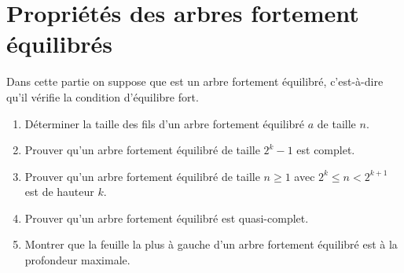 \section{Propriétés des arbres fortement équilibrés}
Dans cette partie on suppose que  est un arbre fortement équilibré, c'est-à-dire qu'il vérifie la condition d'équilibre fort.
\begin{Exercise}{\it
\begin{enumerate}
\item Déterminer la taille des fils d'un arbre fortement équilibré $a$ de taille $n$.
\item Prouver qu'un arbre  fortement équilibré de taille $2^k-1$ est complet.
\item Prouver qu'un arbre  fortement équilibré de taille $n\ge 1$ avec $2^k \le n < 2^{k+1}$ est de hauteur $k$.
\item Prouver qu'un arbre  fortement équilibré est quasi-complet.
\item Montrer que la feuille la plus à gauche d'un arbre fortement équilibré est à la profondeur maximale.
\end{enumerate} }
\end{Exercise}
